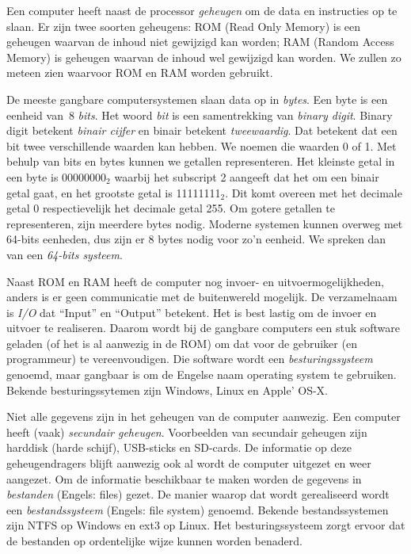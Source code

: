 Een computer heeft naast de processor \textsl{geheugen} om de data en instructies op te slaan. Er zijn twee soorten geheugens: ROM (Read Only Memory) is een geheugen waarvan de inhoud niet gewijzigd kan worden; RAM (Random Access Memory) is geheugen waarvan de inhoud wel gewijzigd kan worden. We zullen zo meteen zien waarvoor ROM en RAM worden gebruikt.

\begin{infobox}
De meeste gangbare computersystemen slaan data op in \textsl{bytes}. Een byte is een eenheid van~8 \textsl{bits}. Het woord \textsl{bit} is een samentrekking van \textsl{binary digit}. Binary digit betekent \textsl{binair cijfer} en binair betekent \textsl{tweewaardig}. Dat betekent dat een bit twee verschillende waarden kan hebben. We noemen die waarden 0 of 1. Met behulp van bits en bytes kunnen we getallen representeren. Het kleinste getal in een byte is 00000000$_2$ waarbij het subscript 2 aangeeft dat het om een binair getal gaat, en het grootste getal is 11111111$_2$. Dit komt overeen met het decimale getal 0 respectievelijk het decimale getal 255. Om gotere getallen te representeren, zijn meerdere bytes nodig. Moderne systemen kunnen overweg met 64-bits eenheden, dus zijn er 8 bytes nodig voor zo'n eenheid. We spreken dan van een \textsl{64-bits systeem}.
\end{infobox}

Naast ROM en RAM heeft de computer nog invoer- en uitvoermogelijkheden, anders is er geen communicatie met de buitenwereld mogelijk. De verzamelnaam is \textsl{I/O} dat ``Input'' en ``Output'' betekent. Het is best lastig om de invoer en uitvoer te realiseren. Daarom wordt bij de gangbare computers een stuk software geladen (of het is al aanwezig in de ROM) om dat voor de gebruiker (en programmeur) te vereenvoudigen. Die software wordt een \textsl{besturingssysteem} genoemd, maar gangbaar is om de Engelse naam operating system te gebruiken. Bekende besturingssytemen zijn Windows, Linux en Apple' OS-X.

Niet alle gegevens zijn in het geheugen van de computer aanwezig. Een computer heeft (vaak) \textsl{secundair geheugen}. Voorbeelden van secundair geheugen zijn harddisk (harde schijf), USB-sticks en SD-cards. De informatie op deze geheugendragers blijft aanwezig ook al wordt de computer uitgezet en weer aangezet. Om de informatie beschikbaar te maken worden de gegevens in \textsl{bestanden} (Engels: files) gezet. De manier waarop dat wordt gerealiseerd wordt een \textsl{bestandssysteem} (Engels: file system) genoemd. Bekende bestandssystemen zijn NTFS op Windows en ext3 op Linux. Het besturingssysteem zorgt ervoor dat de bestanden op ordentelijke wijze kunnen worden benaderd.

